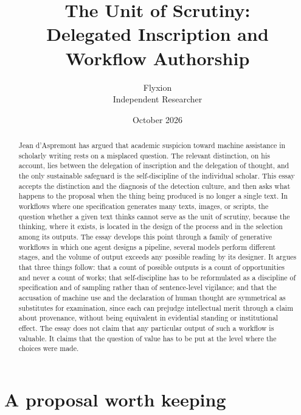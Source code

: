 \documentclass[12pt]{article}
\title{The Unit of Scrutiny:\\Delegated Inscription and Workflow Authorship}
\author{Flyxion\\Independent Researcher}
\date{October 2026}
\begin{document}
\maketitle

\begin{abstract}
\noindent Jean d'Aspremont has argued that academic suspicion toward machine assistance in scholarly writing rests on a misplaced question. The relevant distinction, on his account, lies between the delegation of inscription and the delegation of thought, and the only sustainable safeguard is the self-discipline of the individual scholar. This essay accepts the distinction and the diagnosis of the detection culture, and then asks what happens to the proposal when the thing being produced is no longer a single text. In workflows where one specification generates many texts, images, or scripts, the question whether a given text thinks cannot serve as the unit of scrutiny, because the thinking, where it exists, is located in the design of the process and in the selection among its outputs. The essay develops this point through a family of generative workflows in which one agent designs a pipeline, several models perform different stages, and the volume of output exceeds any possible reading by its designer. It argues that three things follow: that a count of possible outputs is a count of opportunities and never a count of works; that self-discipline has to be reformulated as a discipline of specification and of sampling rather than of sentence-level vigilance; and that the accusation of machine use and the declaration of human thought are symmetrical as substitutes for examination, since each can prejudge intellectual merit through a claim about provenance, without being equivalent in evidential standing or institutional effect. The essay does not claim that any particular output of such a workflow is valuable. It claims that the question of value has to be put at the level where the choices were made.
\end{abstract}

\section{A proposal worth keeping}
\end{document}
